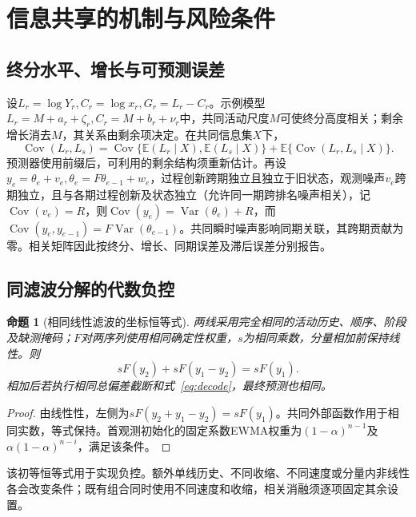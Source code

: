 \documentclass[preprint,12pt]{elsarticle}
\newtheorem{proposition}{命题}
\begin{document}
\section{信息共享的机制与风险条件}
\subsection{终分水平、增长与可预测误差}
设\(L_r=\log Y_r,C_r=\log x_r,G_r=L_r-C_r\)。示例模型\(L_r=M+a_r+\zeta_r,C_r=M+b_r+\nu_r\)中，共同活动尺度\(M\)可使终分高度相关；剩余增长消去\(M\)，其关系由剩余项决定。在共同信息集\(X\)下，
\begin{equation}\label{eq:cov}
\operatorname{Cov}(L_r,L_s)=\operatorname{Cov}\{\mathbb E(L_r\mid X),\mathbb E(L_s\mid X)\}+\mathbb E\{\operatorname{Cov}(L_r,L_s\mid X)\}.
\end{equation}
预测器使用前缀后，可利用的剩余结构须重新估计。再设\(y_e=\theta_e+v_e,\theta_e=F\theta_{e-1}+w_e\)，过程创新跨期独立且独立于旧状态，观测噪声\(v_e\)跨期独立，且与各期过程创新及状态独立（允许同一期跨排名噪声相关），记\(\operatorname{Cov}(v_e)=R\)，则\(\operatorname{Cov}(y_e)=\operatorname{Var}(\theta_e)+R\)，而\(\operatorname{Cov}(y_e,y_{e-1})=F\operatorname{Var}(\theta_{e-1})\)。共同瞬时噪声影响同期关联，其跨期贡献为零。相关矩阵因此按终分、增长、同期误差及滞后误差分别报告。

\subsection{同滤波分解的代数负控}
\begin{proposition}[相同线性滤波的坐标恒等式]\label{prop:identity}
两线采用完全相同的活动历史、顺序、阶段及缺测掩码；\(F\)对两序列使用相同确定性权重，\(s\)为相同乘数，分量相加前保持线性。则
\begin{equation}\label{eq:identity}
sF(y_2)+sF(y_1-y_2)=sF(y_1).
\end{equation}
相加后若执行相同总偏差截断和式~\eqref{eq:decode}，最终预测也相同。
\end{proposition}
\begin{proof}
由线性性，左侧为\(sF(y_2+y_1-y_2)=sF(y_1)\)。共同外部函数作用于相同实数，等式保持。首观测初始化的固定系数EWMA权重为\((1-\alpha)^{n-1}\)及\(\alpha(1-\alpha)^{n-i}\)，满足该条件。
\end{proof}
该初等恒等式用于实现负控。额外单线历史、不同收缩、不同速度或分量内非线性各会改变条件；既有组合同时使用不同速度和收缩，相关消融须逐项固定其余设置。
\end{document}
